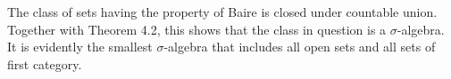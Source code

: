 The class of sets having the property of Baire is closed under countable union. Together with Theorem 4.2, this shows that the class in question is a $\sigma$-algebra. It is evidently the smallest $\sigma$-algebra that includes all open sets and all sets of first category.
